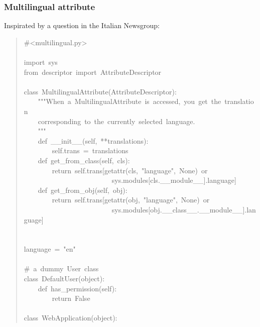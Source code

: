 \documentclass[10pt,a4paper,english]{article}
\begin{document}

\hypertarget{multilingual-attribute}{}
\subsubsection*{Multilingual attribute}

Inspirated by a question in the Italian Newsgroup:
\begin{quote}{\ttfamily \raggedright \noindent
{\#}<multilingual.py>~\\
~\\
import~sys~\\
from~descriptor~import~AttributeDescriptor~\\
~\\
class~MultilingualAttribute(AttributeDescriptor):~\\
~~~~"{}"{}"When~a~MultilingualAttribute~is~accessed,~you~get~the~translation~~\\
~~~~corresponding~to~the~currently~selected~language.~\\
~~~~"{}"{}"~\\
~~~~def~{\_}{\_}init{\_}{\_}(self,~**translations):~\\
~~~~~~~~self.trans~=~translations~\\
~~~~def~get{\_}from{\_}class(self,~cls):~\\
~~~~~~~~return~self.trans{[}getattr(cls,~"language",~None)~or~\\
~~~~~~~~~~~~~~~~~~~~~~~~~sys.modules{[}cls.{\_}{\_}module{\_}{\_}].language]~\\
~~~~def~get{\_}from{\_}obj(self,~obj):~\\
~~~~~~~~return~self.trans{[}getattr(obj,~"language",~None)~or~\\
~~~~~~~~~~~~~~~~~~~~~~~~~sys.modules{[}obj.{\_}{\_}class{\_}{\_}.{\_}{\_}module{\_}{\_}].language]~\\
~~~~~~\\
~\\
language~=~"en"~\\
~\\
{\#}~a~dummy~User~class~\\
class~DefaultUser(object):~\\
~~~~def~has{\_}permission(self):~\\
~~~~~~~~return~False~\\
~~~~\\
class~WebApplication(object):~\\
}
\end{quote}
\end{document}
